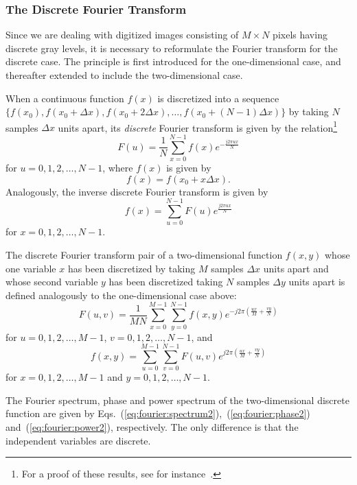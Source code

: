 \subsubsection{The Discrete Fourier Transform}

Since we are dealing with digitized images consisting of $M\times N$
pixels having discrete gray levels, it is necessary to reformulate the
Fourier transform for the discrete case.  The principle is first
introduced for the one-dimensional case, and thereafter extended to
include the two-dimensional case.

When a continuous function $f(x)$ is discretized into a sequence
$\{f(x_{0}),f(x_{0}+\Delta x),f(x_{0}+2\Delta x),\ldots,
f(x_{0}+(N-1)\Delta x)\}$ by taking $N$ samples $\Delta x$ units
apart, its {\em discrete\/} Fourier transform is given by the
relation\footnote{For a proof of these results, see for
  instance~\cite{brigham}.}
\begin{equation}
\label{eq:fourier:discrete}
  F(u)=\frac{1}{N}\sum_{x=0}^{N-1}f(x)e^{-\frac{j2\pi ux}{N}}
\end{equation}
for $u=0,1,2,\ldots,N-1$, where $f(x)$ is given by
\begin{equation}
  f(x)=f(x_{0}+x\Delta x)\mbox{.}
\end{equation}
Analogously, the inverse discrete Fourier transform is given by
\begin{equation}
\label{eq:fourier:discrete:inverse}
  f(x)=\sum_{u=0}^{N-1}F(u)e^{\frac{j2\pi ux}{N}}
\end{equation}
for $x=0,1,2,\ldots,N-1$.

The discrete Fourier transform pair of a two-dimensional function
$f(x,y)$ whose one variable $x$ has been discretized by taking $M$
samples $\Delta x$ units apart and whose second variable $y$ has been
discretized taking $N$ samples $\Delta y$ units apart is defined
analogously to the one-dimensional case above:
\begin{equation}
  F(u,v)=\frac{1}{MN}\sum_{x=0}^{M-1}\sum_{y=0}^{N-1}f(x,y)e^{-j2\pi
    (\frac{ux}{M}+\frac{vy}{N})} 
\end{equation}
for $u=0,1,2,\ldots,M-1$, $v=0,1,2,\ldots,N-1$, and
\begin{equation}
  f(x,y)=\sum_{u=0}^{M-1}\sum_{v=0}^{N-1}F(u,v)e^{j2\pi
    (\frac{ux}{M}+\frac{vy}{N})} 
\end{equation}
for $x=0,1,2,\ldots,M-1$ and $y=0,1,2,\ldots,N-1$.

The Fourier spectrum, phase and power spectrum of the two-dimensional
discrete function are given by
Eqs.~(\ref{eq:fourier:spectrum2}),~(\ref{eq:fourier:phase2})
and~(\ref{eq:fourier:power2}), respectively.  The only difference is
that the independent variables are discrete.

